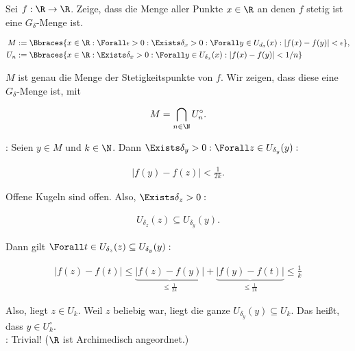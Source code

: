 \begin{exercise}

Sei $f: \R \rightarrow \R$. Zeige, dass die Menge aller Punkte $x \in \R$ an denen $f$ stetig ist eine $G_{\delta}$-Menge ist.

\end{exercise}

\begin{solution}

\begin{align*}
  M & := \Bbraces
  {
    x \in \R:
    \Forall \epsilon > 0:
    \Exists \delta_x > 0:
    \Forall y \in U_{d_x}(x):
    |f(x) - f(y)| < \epsilon
  }, \\
  U_n & := \Bbraces
  {
    x \in \R:
    \Exists \delta_x > 0:
    \Forall y \in U_{\delta_x}(x):
    |f(x) - f(y)| < 1/n
  }
\end{align*}

$M$ ist genau die Menge der Stetigkeitspunkte von $f$.
Wir zeigen, dass diese eine $G_\delta$-Menge ist, mit

\begin{align*}
  M = \bigcap_{n \in \N} U_n^\circ.
\end{align*}

\Quote{$\subseteq$}:
Seien $y \in M$ und $k \in \N$.
Dann $\Exists \delta_y > 0: \Forall z \in U_{\delta_y}(y):$

\begin{align*}
    |f(y) - f(z)| < \frac{1}{2k}.
\end{align*}

Offene Kugeln sind offen.
Also, $\Exists \delta_z > 0:$

\begin{align*}
  U_{\delta_z}(z)
  \subseteq
  U_{\delta_y}(y).
\end{align*}

Dann gilt $\Forall t \in U_{\delta_z}(z) \subseteq U_{\delta_y}(y):$

\begin{align*}
    |f(z) - f(t)|
    \leq
    \underbrace{|f(z) - f(y)|}_{\leq \frac{1}{2 k}} +
    \underbrace{|f(y) - f(t)|}_{\leq \frac{1}{2 k}}
    \leq
    \frac{1}{k}
\end{align*}

Also, liegt $z \in U_k$.
Weil $z$ beliebig war, liegt die ganze $U_{\delta_y}(y) \subseteq U_k$.
Das heißt, dass $y \in U_k^\circ.$ \\

\Quote{$\supseteq$}:
Trivial!
($\R$ ist Archimedisch angeordnet.)

\end{solution}
